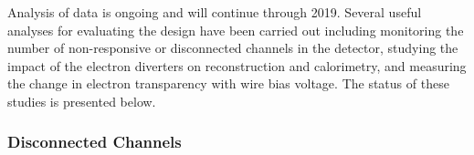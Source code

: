 Analysis of  data is ongoing and will continue through 2019.  Several useful analyses for evaluating the  design have been carried out including monitoring the number of non-responsive or disconnected channels in the detector, studying the impact of the electron diverters on reconstruction and calorimetry, and measuring the change in electron transparency with wire bias voltage.  The status of these studies is presented below.   


\subsubsection{Disconnected Channels}
\label{sec:fdsp-apa-qa-protodune-ops-dead-channels}

